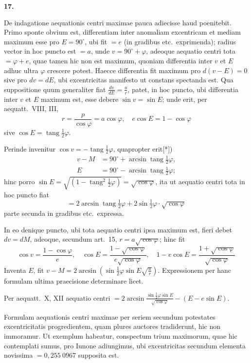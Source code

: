 \documentclass[12pt,a4paper]{book}
\newcommand{\tang}{\operatorname{tang}}
\begin{document}
\textbf{17.}

De indagatione aequationis centri maximae pauca adiecisse haud poenitebit. Primo sponte obvium est, differentiam inter anomaliam excentricam et mediam maximum esse pro $E=90^{\circ}$, ubi fit $=e$ (in gradibus etc.~exprimenda); radius vector in hoc puncto est $=a$, unde $v=90^{\circ}+\varphi$, adeoque aequatio centri tota $=\varphi+e$, quae tamen hic non est maximum, quoniam differentia inter $v$ et $E$ adhuc ultra $\varphi$ crescere potest. Haecce differentia fit maximum pro $d(v-E)=0$ sive pro $dv=dE$, ubi excentricitas manifesto ut constans spectanda est. Qua suppositione quum generaliter fiat $\frac{dv}{dE}=\frac{a}{r}$, patet, in hoc puncto, ubi differentia inter $v$ et $E$ maximum est, esse debere $\sin v=\sin E$; unde erit, per aequatt.~VIII, III,
\[
r=\frac{p}{\cos\varphi}=a\cos\varphi,\quad e\cos E=1-\cos\varphi
\]
sive $\cos E=\tang\tfrac{1}{2}\varphi$.

Perinde invenitur $\cos v=-\tang\tfrac{1}{2}\varphi$, quapropter erit[*])
\begin{align*}
v-M &= 90^{\circ}+\arcsin\tang\tfrac{1}{2}\varphi,\\
E &= 90^{\circ}-\arcsin\tang\tfrac{1}{2}\varphi;
\end{align*}
hinc porro $\sin E=\sqrt{(1-\tang^{2}\tfrac{1}{2}\varphi)}=\sqrt{\cos\varphi}$, ita ut aequatio centri tota in hoc puncto fiat
\[
=2\arcsin\tang\tfrac{1}{2}\varphi+2\sin\tfrac{1}{2}\varphi\cdot\sqrt{\cos\varphi}
\]
parte secunda in gradibus etc.~expressa.

In eo denique puncto, ubi tota aequatio centri ipsa maximum est, fieri debet $dv=dM$, adeoque, secundum art.~15, $r=a\sqrt{\cos\varphi}$; hinc fit
\[
\cos v=\frac{1-\cos\varphi}{e},\quad \cos E=\frac{1-\sqrt{\cos\varphi}}{e\sqrt{\cos\varphi}},\quad 1-e\cos E=\frac{1+\sqrt{\cos\varphi}}{\sqrt{\cos\varphi}}
\]
Inventa $E$, fit $v-M=2\arcsin(\sin\tfrac{1}{2}\varphi\sin E\sqrt{\frac{a}{r}})$. Expressionem per hanc formulam ultima praecisione determinare licet.

Per aequatt.~X, XII aequatio centri $=2\arcsin\frac{\sin\tfrac{1}{2}\varphi\sin E}{\sqrt{\cos\varphi}}-(E-e\sin E)$.

Formulam aequationis centri maximae per seriem secundum potestates excentricitatis progredientem, quam plures auctores tradiderunt, hic non immoramur. Ut exemplum habeatur, conspectum trium maximorum, quae hic contemplati sumus, pro Iunone adiungimus, ubi excentricitas secundum elementa novissima $=0{,}255\ 0967$ supposita est.
\end{document}

